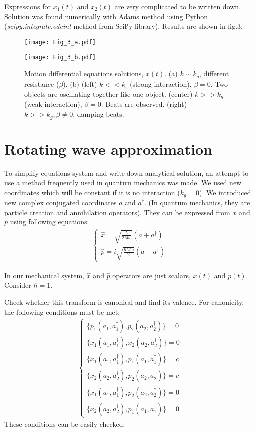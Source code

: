 \documentclass[%
aps, pra,
amsmath,amssymb,
reprint,%
superscriptaddress
]{revtex4-2}
\begin{document}
Expressions for $x_1(t)$ and $x_2(t)$ are very complicated to be written down. Solution was found numerically with Adams method using Python (\textit{scipy.integrate.odeint} method from SciPy library). Results are shown in fig.3.
\begin{figure*}
	\texttt{[image: Fig\_3\_a.pdf]}
	
	\texttt{[image: Fig\_3\_b.pdf]}
	\caption{Motion differential equations solutions, $x(t)$. (a) $k \sim k_g$, different resistance ($\beta$). (b) (left) $k<<k_g$ (strong interaction), $\beta=0$. Two objects are oscillating together like one object. (center) $k>>k_g$ (weak interaction), $\beta=0$. Beats are observed. (right) $k>>k_g, \beta \ne 0$, damping beats.}
\end{figure*}

\section{Rotating wave approximation}

To simplify equations system and write down analytical solution, an attempt to use a method frequently used in quantum mechanics was made. We used new coordinates which will be constant if it is no interaction ($k_g=0$).
\newline We introduced new complex conjugated coordinates $a$ and $a^\dag$. (In quantum mechanics, they are particle creation and annihilation operators). They can be expressed from $x$ and $p$ using following equations:
\begin{align*}
	\begin{cases}
		\hat{x} = \sqrt{\frac{\hbar}{2M\omega}}\left(a+a^\dag\right)
		\\
		\hat{p} = i\sqrt{\frac{\hbar M \omega}{2}}\left(a-a^\dag\right)
	\end{cases}	
\end{align*}

In our mechanical system, $\hat{x}$ and $\hat{p}$  operators are just scalars, $x(t)$ and $p(t)$. Consider $\hbar=1$.\newline

Check whether this transform is canonical and find its valence.
For canonicity, the following conditions must be met:
\begin{align*}
	\begin{cases}
		\{p_1(a_1, a^\dag_1), p_2(a_2, a^\dag_2)\}=0
		\\
		\{x_1(a_1, a^\dag_1), x_2(a_2, a^\dag_2)\}=0
		\\
		\{x_1(a_1, a^\dag_1), p_1(a_1, a^\dag_1)\}=c
		\\
		\{x_2(a_2, a^\dag_2), p_2(a_2, a^\dag_2)\}=c
		\\
		\{x_1(a_1, a^\dag_1), p_2(a_2, a^\dag_2)\}=0
		\\
		\{x_2(a_2, a^\dag_2), p_1(a_1, a^\dag_1)\}=0
	\end{cases}
\end{align*}
These conditions can be easily checked:
\end{document}
